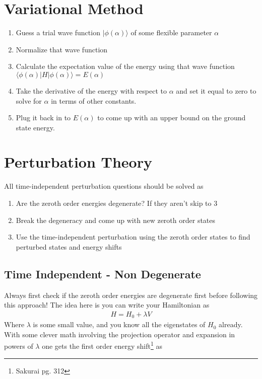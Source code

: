 \section{Variational Method}
\begin{enumerate}
\item Guess a trial wave function $|\phi(\alpha)\rangle$ of some flexible parameter $\alpha$
\item Normalize that wave function
\item Calculate the expectation value of the energy using that wave function $\langle \phi(\alpha) |H|\phi(\alpha)\rangle = E(\alpha)$
\item Take the derivative of the energy with respect to $\alpha$ and set it equal to zero to solve for $\alpha$ in terms of other constants.
\item Plug it back in to $E(\alpha)$ to come up with an upper bound on the ground state energy.
\end{enumerate}




\section{Perturbation Theory}

All time-independent perturbation questions should be solved as
\begin{enumerate}
\item Are the zeroth order energies degenerate? If they aren't skip to 3
\item Break the degeneracy and come up with new zeroth order states
\item Use the time-independent perturbation using the zeroth order states to find perturbed states and energy shifts
\end{enumerate}


\subsection{Time Independent - Non Degenerate}
Always first check if the zeroth order energies are degenerate first before following this approach! The idea here is you can write your Hamiltonian as
\begin{align}
H = H_0 + \lambda V
\end{align}
Where $\lambda$ is some small value, and you know all the eigenstates of $H_0$ already. With some clever math involving the projection operator and expansion in powers of $\lambda$ one gets the first order energy shift\footnote{Sakurai pg. 312}  as

